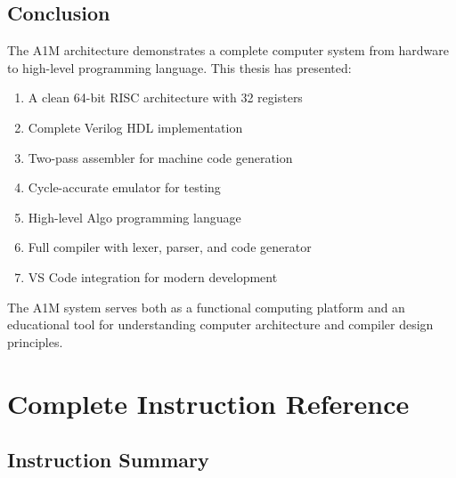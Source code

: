 \documentclass[12pt,a4paper,oneside]{book}
\begin{document}
\section{Conclusion}

The A1M architecture demonstrates a complete computer system from hardware to high-level programming language. This thesis has presented:

\begin{enumerate}
    \item A clean 64-bit RISC architecture with 32 registers
    \item Complete Verilog HDL implementation
    \item Two-pass assembler for machine code generation
    \item Cycle-accurate emulator for testing
    \item High-level Algo programming language
    \item Full compiler with lexer, parser, and code generator
    \item VS Code integration for modern development
\end{enumerate}

The A1M system serves both as a functional computing platform and an educational tool for understanding computer architecture and compiler design principles.

\appendix

\chapter{Complete Instruction Reference}

\section{Instruction Summary}
\end{document}
